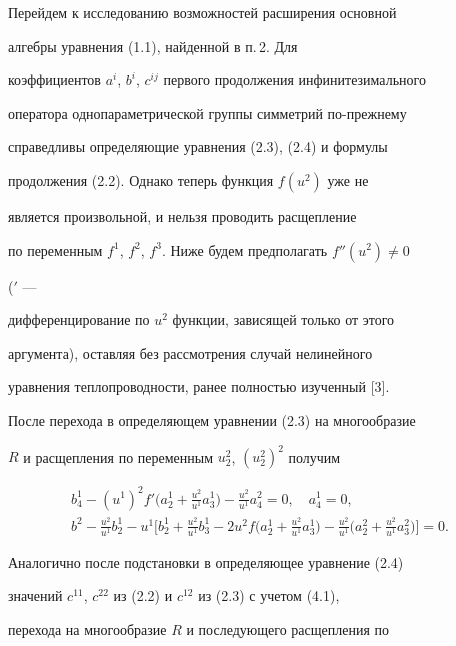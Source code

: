  


Перейдем к исследованию возможностей расширения основной 


алгебры уравнения (1.1), найденной в п.\,2. Для 


коэффициентов $a^i$, $b^i$, $c^{ij}$ первого продолжения инфинитезимального 


оператора однопараметрической группы симметрий по-прежнему 


справедливы определяющие уравнения (2.3), (2.4) и формулы 


продолжения (2.2). Однако теперь функция $f(u^2)$ уже не 


является произвольной, и нельзя проводить расщепление 


по переменным $f^1$, $f^2$, $f^3$. Ниже будем предполагать $f''(u^2)\ne0$ 


(${}'$ --- 


дифференцирование по $u^2$ функции, зависящей только от этого 


аргумента), оставляя без рассмотрения случай нелинейного 


уравнения теплопроводности, ранее полностью изученный [3]. 


 


После перехода в определяющем уравнении (2.3) на многообразие 


$R$ и расщепления по переменным $u^2_2$, $(u^2_2)^2$ получим 


\begin{gather} 


b^1_4-(u^1)^2f'\bigg(a^1_2+\frac{u^2}{u^1}a^1_3\bigg)- 


\frac{u^2}{u^1}a^2_4=0,\quad a^1_4=0,\\ 


% 


b^2-\frac{u^2}{u^1}b^1_2-u^1\bigg[b^1_2+\frac{u^2}{u^1} 


b^1_3-2u^2f\bigg(a^1_2+\frac{u^2}{u^1}a^1_3\bigg)- 


\frac{u^2}{u^1}\bigg(a^2_2+\frac{u^2}{u^1}a^2_3\bigg)\bigg]=0. 


\end{gather} 


Аналогично после подстановки в определяющее уравнение (2.4) 


значений $c^{11}$, $c^{22}$ из (2.2) и $c^{12}$ из (2.3) с учетом (4.1), 


перехода на многообразие $R$ и последующего расщепления по 


